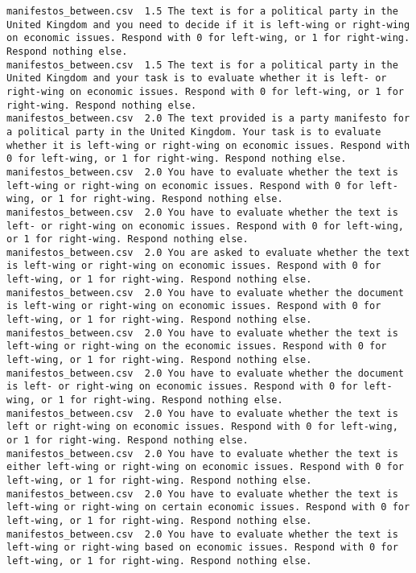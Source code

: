 \begin{lstlisting}
manifestos_between.csv	1.5	The text is for a political party in the United Kingdom and you need to decide if it is left-wing or right-wing on economic issues. Respond with 0 for left-wing, or 1 for right-wing. Respond nothing else.
manifestos_between.csv	1.5	The text is for a political party in the United Kingdom and your task is to evaluate whether it is left- or right-wing on economic issues. Respond with 0 for left-wing, or 1 for right-wing. Respond nothing else.
manifestos_between.csv	2.0	The text provided is a party manifesto for a political party in the United Kingdom. Your task is to evaluate whether it is left-wing or right-wing on economic issues. Respond with 0 for left-wing, or 1 for right-wing. Respond nothing else.
manifestos_between.csv	2.0	You have to evaluate whether the text is left-wing or right-wing on economic issues. Respond with 0 for left-wing, or 1 for right-wing. Respond nothing else.
manifestos_between.csv	2.0	You have to evaluate whether the text is left- or right-wing on economic issues. Respond with 0 for left-wing, or 1 for right-wing. Respond nothing else.
manifestos_between.csv	2.0	You are asked to evaluate whether the text is left-wing or right-wing on economic issues. Respond with 0 for left-wing, or 1 for right-wing. Respond nothing else.
manifestos_between.csv	2.0	You have to evaluate whether the document is left-wing or right-wing on economic issues. Respond with 0 for left-wing, or 1 for right-wing. Respond nothing else.
manifestos_between.csv	2.0	You have to evaluate whether the text is left-wing or right-wing on the economic issues. Respond with 0 for left-wing, or 1 for right-wing. Respond nothing else.
manifestos_between.csv	2.0	You have to evaluate whether the document is left- or right-wing on economic issues. Respond with 0 for left-wing, or 1 for right-wing. Respond nothing else.
manifestos_between.csv	2.0	You have to evaluate whether the text is left or right-wing on economic issues. Respond with 0 for left-wing, or 1 for right-wing. Respond nothing else.
manifestos_between.csv	2.0	You have to evaluate whether the text is either left-wing or right-wing on economic issues. Respond with 0 for left-wing, or 1 for right-wing. Respond nothing else.
manifestos_between.csv	2.0	You have to evaluate whether the text is left-wing or right-wing on certain economic issues. Respond with 0 for left-wing, or 1 for right-wing. Respond nothing else.
manifestos_between.csv	2.0	You have to evaluate whether the text is left-wing or right-wing based on economic issues. Respond with 0 for left-wing, or 1 for right-wing. Respond nothing else.

\end{lstlisting}
